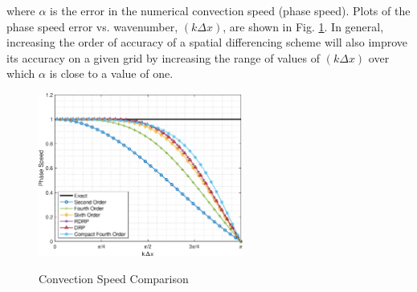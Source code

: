 \documentclass[conf]{new-aiaa}
\begin{document}
where $\alpha$ is the error in the numerical convection speed (phase speed). 
Plots of the phase speed error vs. wavenumber, $\left(k\Delta{x}\right)$, are shown in Fig. \ref{fig:alpha}. 
In general, increasing the order of accuracy of a spatial differencing scheme will also improve its accuracy on a given grid by increasing the range of values of $\left(k\Delta{x}\right)$ over which $\alpha$ is close to a value of one. 
\begin{figure}[hbtp!]
	\centering
	{\includegraphics[width=0.6\textwidth]{Figures/Phase_Speed}}
	\caption{Convection Speed Comparison}
	\label{fig:alpha}
\end{figure}
\end{document}
